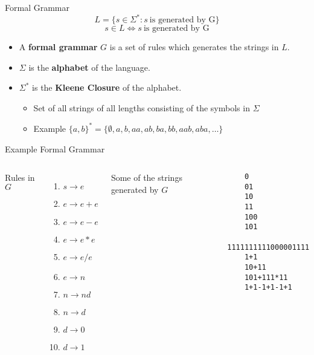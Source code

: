 \documentclass[]{beamer}
\begin{document}
\begin{frame}{Formal Grammar}
    \[
    L = \{ s \in \Sigma^* : s\ \textrm{is generated by G} \}
    \]
    \[
        s \in L \iff s\ \textrm{is generated by G}
    \]
    \begin{itemize}
        \item A {\bf formal grammar} $G$ is a set of rules which generates the strings in $L$.
        \item $\Sigma$ is the {\bf alphabet} of the language.
        \item $\Sigma^*$ is the {\bf Kleene Closure} of the alphabet.
        \begin{itemize}
            \item Set of all strings of all lengths consisting of the symbols in $\Sigma$
            \item Example $\{a,b\}^* = \{\emptyset, a, b, aa, ab, ba, bb, aab, aba, \ldots \}$
        \end{itemize}
    \end{itemize}
\end{frame}

\begin{frame}[fragile]{Example Formal Grammar}
    \begin{columns}
    Rules in $G$
    \begin{enumerate}
        \item $s \rightarrow e$
        \item $e \rightarrow e + e$
        \item $e \rightarrow e - e$
        \item $e \rightarrow e * e$
        \item $e \rightarrow e / e$
        \item $e \rightarrow n$
        \item $n \rightarrow nd $
        \item $n \rightarrow d $
        \item $d \rightarrow 0 $
        \item $d \rightarrow 1 $
    \end{enumerate}
    Some of the strings generated by $G$
    \begin{verbatim}
    0
    01
    10
    11
    100
    101
    11111111110000011111
    1+1
    10+11
    101+111*11
    1+1-1+1-1+1
    \end{verbatim}
    \end{columns}
\end{frame}
\end{document}
